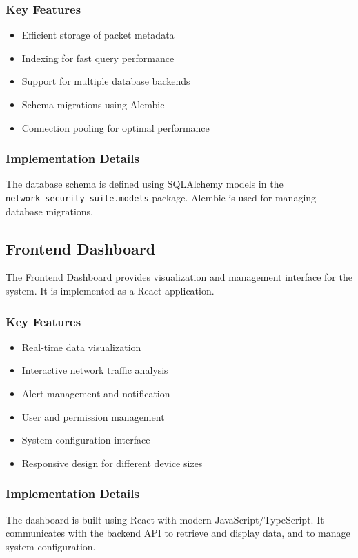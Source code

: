 \subsubsection{Key Features}
\begin{itemize}
    \item Efficient storage of packet metadata
    \item Indexing for fast query performance
    \item Support for multiple database backends
    \item Schema migrations using Alembic
    \item Connection pooling for optimal performance
\end{itemize}

\subsubsection{Implementation Details}
The database schema is defined using SQLAlchemy models in the \texttt{network\_security\_suite.models} package. Alembic is used for managing database migrations.

\subsection{Frontend Dashboard}
The Frontend Dashboard provides visualization and management interface for the system. It is implemented as a React application.

\subsubsection{Key Features}
\begin{itemize}
    \item Real-time data visualization
    \item Interactive network traffic analysis
    \item Alert management and notification
    \item User and permission management
    \item System configuration interface
    \item Responsive design for different device sizes
\end{itemize}

\subsubsection{Implementation Details}
The dashboard is built using React with modern JavaScript/TypeScript. It communicates with the backend API to retrieve and display data, and to manage system configuration.